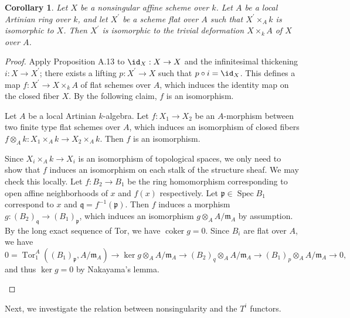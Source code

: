 \documentclass{article}
\newtheorem{corollary}[theorem]{Corollary}
\theoremstyle{definition}
\newcommand{\Spec}{\operatorname{Spec}}
\newcommand{\coker}{\operatorname{coker}}
\newcommand{\Tor}{\operatorname{Tor}}
\begin{document}
\begin{corollary}
Let \(X\) be a nonsingular affine scheme over \(k\). Let \(A\) be a local Artinian ring over \(k\), and let \(X^{\prime}\) be a scheme flat over \(A\) such that \(X^{\prime}\times_{A}k\) is isomorphic to \(X\). Then \(X^{\prime}\) is isomorphic to the trivial deformation \(X\times_{k}A\) of \(X\) over \(A\).
\end{corollary}

\begin{proof}
Apply Proposition A.13 to \(\id_X:X\to X\) and the infinitesimal thickening \(i:X\to X^{\prime}\); there exists a lifting \(p:X^{\prime}\to X\) such that \(p\circ i = \id_X\). This defines a map \(f:X^{\prime}\to X\times_{k}A\) of flat schemes over \(A\), which induces the identity map on the closed fiber \(X\). By the following claim, \(f\) is an isomorphism.

\begin{claim}
Let \(A\) be a local Artinian \(k\)-algebra. Let \(f:X_{1}\to X_{2}\) be an \(A\)-morphism between two finite type flat schemes over \(A\), which induces an isomorphism of closed fibers \(f\otimes_{A}k:X_{1}\times_{A}k\to X_{2}\times_{A}k\). Then \(f\) is an isomorphism.
\end{claim}
\begin{subproof}
Since \(X_{i}\times_{A}k\to X_{i}\) is an isomorphism of topological spaces, we only need to show that \(f\) induces an isomorphism on each stalk of the structure sheaf. We may check this locally. Let \(f:B_{2}\to B_{1}\) be the ring homomorphism corresponding to open affine neighborhoods of \(x\) and \(f(x)\) respectively. Let \(\mathfrak{p}\in \Spec B_{1}\) correspond to \(x\) and \(\mathfrak{q} = f^{-1}(\mathfrak{p})\). Then \(f\) induces a morphism \(g:(B_{2})_{\mathfrak{q}}\to (B_{1})_{\mathfrak{p}}\), which induces an isomorphism \(g\otimes_{A}A / \mathfrak{m}_{A}\) by assumption. By the long exact sequence of Tor, we have \(\coker g = 0\). Since \(B_{i}\) are flat over \(A\), we have
\[
0 = \Tor_{1}^{A}((B_{1})_{\mathfrak{p}},A / \mathfrak{m}_{A})\longrightarrow \ker g\otimes_{A}A / \mathfrak{m}_{A}\longrightarrow (B_{2})_{q}\otimes_{A}A / \mathfrak{m}_{A}\longrightarrow (B_{1})_{p}\otimes_{A}A / \mathfrak{m}_{A}\longrightarrow 0,
\]
and thus \(\ker g = 0\) by Nakayama's lemma.
\end{subproof}
\end{proof}

Next, we investigate the relation between nonsingularity and the \(T^{i}\) functors.
\end{document}
